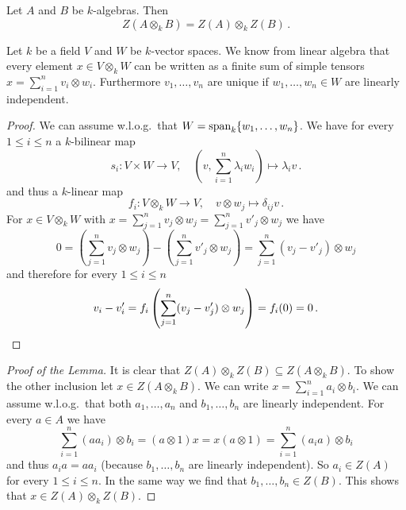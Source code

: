\begin{lem}\label{lem: Z(A o B) = Z(A) o Z(B)}
  Let $A$ and $B$ be $k$-algebras.
  Then
  \[
      Z(A \otimes_k B)
    = Z(A) \otimes_k Z(B) \,.
  \]
\end{lem}


\begin{rec}
  Let $k$ be a field $V$ and $W$ be $k$-vector spaces.
  We know from linear algebra that every element $x \in V \otimes_k W$ can be written as a finite sum of simple tensors $x = \sum_{i=1}^n v_i \otimes w_i$.
  Furthermore $v_1, \dotsc, v_n$ are unique if $w_1, \dotsc, w_n \in W$ are linearly independent.
  \begin{proof}
    We can assume w.l.o.g.\ that $W = \operatorname{span}_k \{w_1, \dotsc, w_n\}$.
    We have for every $1 \leq i \leq n$ a $k$-bilinear map
    \[
              s_i
      \colon  V \times W \to V,
      \quad   \left(v, \sum_{i=1}^n \lambda_i w_i\right)
      \mapsto \lambda_i v \,.
    \]
    and thus a $k$-linear map
    \[
              f_i
      \colon  V \otimes_k W
      \to     V,
      \quad   v \otimes w_j
      \mapsto \delta_{ij} v \,.
    \]
    For $x \in V \otimes_k W$ with $x = \sum_{j=1}^n v_j \otimes w_j = \sum_{j=1}^n v'_j \otimes w_j$ we have
    \[
        0
      =   \left( \sum_{j=1}^n v_j \otimes w_j \right)
        - \left( \sum_{j=1}^n v'_j \otimes w_j \right)
      = \sum_{j=1}^n (v_j - v'_j) \otimes w_j
    \]
    and therefore for every $1 \leq i \leq n$
    \[
        v_i - v'_i
      = f_i\left( \sum_{j=1}^n (v_j - v'_j) \otimes w_j\right)
      = f_i(0)
      = 0 \,.
      \qedhere
    \]
  \end{proof}
\end{rec}


\begin{proof}[Proof of the Lemma]
  It is clear that $Z(A) \otimes_k Z(B) \subseteq Z(A \otimes_k B)$.
  To show the other inclusion let $x \in Z(A \otimes_k B)$.
  We can write $x = \sum_{i=1}^n a_i \otimes b_i$.
  We can assume w.l.o.g.\ that both $a_1, \dotsc, a_n$ and $b_1, \dotsc, b_n$ are linearly independent.
  For every $a \in A$ we have
  \[
      \sum_{i=1}^n (a a_i) \otimes b_i
    = (a \otimes 1) x
    = x (a \otimes 1)
    = \sum_{i=1}^n (a_i a) \otimes b_i
  \]
  and thus $a_i a = a a_i$ (because $b_1, \dotsc, b_n$ are linearly independent).
  So $a_i \in Z(A)$ for every $1 \leq i \leq n$.
  In the same way we find that $b_1, \dotsc, b_n \in Z(B)$.
  This shows that $x \in Z(A) \otimes_k Z(B)$.
\end{proof}


